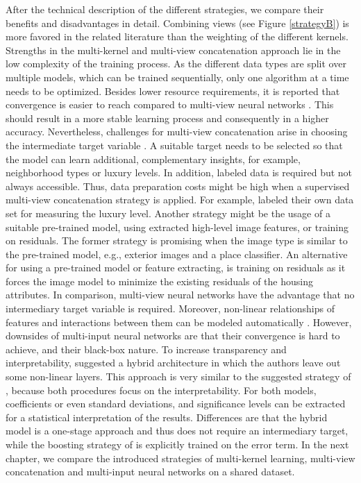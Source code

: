 \documentclass[letterpaper]{article}
\begin{document}
After the technical description of the different strategies, we compare their benefits and disadvantages in detail. Combining views (see Figure \ref{strategyB}) is more favored in the related literature than the weighting of the different kernels. Strengths in the multi-kernel and multi-view concatenation approach lie in the low complexity of the training process. As the different data types are split over multiple models, which can be trained sequentially, only one algorithm at a time needs to be optimized. Besides lower resource requirements, it is reported that convergence is easier to reach compared to multi-view neural networks \cite{bency2017beyond}. This should result in a more stable learning process and consequently in a higher accuracy. Nevertheless, challenges for multi-view concatenation arise in choosing the intermediate target variable \cite{law2019take}. A suitable target needs to be selected so that the model can learn additional, complementary insights, for example, neighborhood types or luxury levels. In addition, labeled data is required but not always accessible. Thus, data preparation costs might be high when a supervised multi-view concatenation strategy is applied. For example, \citeauthor{poursaeed2018vision} \citeyearpar{poursaeed2018vision} labeled their own data set for measuring the luxury level. Another strategy might be the usage of a suitable pre-trained model, using extracted high-level image features, or training on residuals. The former strategy is promising when the image type is similar to the pre-trained model, e.g., exterior images and a place classifier. An alternative for using a pre-trained model or feature extracting, is training on residuals as it forces the image model to minimize the existing residuals of the housing attributes. In comparison, multi-view neural networks have the advantage that no intermediary target variable is required. Moreover, non-linear relationships of features and interactions between them can be modeled automatically \cite{law2019take}. However, downsides of multi-input neural networks are that their convergence is hard to achieve, and their black-box nature. To increase transparency and interpretability, \citeauthor{law2019take} suggested a hybrid architecture in which the authors leave out some non-linear layers. This approach is very similar to the suggested strategy of \citeauthor{naumzik2020one} \citeyearpar{naumzik2020one}, because both procedures focus on the interpretability. For both models, coefficients or even standard deviations, and significance levels can be extracted for a statistical interpretation of the results. Differences are that the hybrid model is a one-stage approach and thus does not require an intermediary target, while the boosting strategy of \citeauthor{naumzik2020one} is explicitly trained on the error term. In the next chapter, we compare the introduced strategies of multi-kernel learning, multi-view concatenation and multi-input neural networks on a shared dataset.
\end{document}
